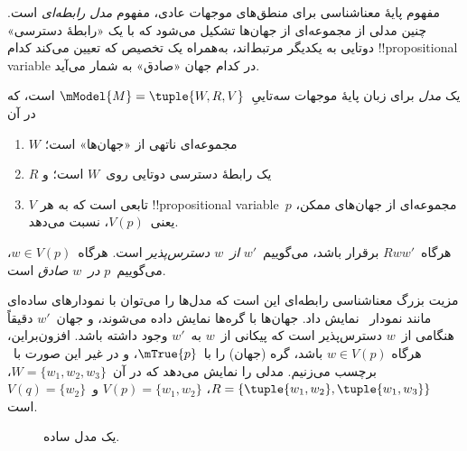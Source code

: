 \documentclass[../../../include/open-logic-section]{subfiles}
\begin{document}


مفهوم پایهٔ معناشناسی برای منطق‌های موجهات عادی، مفهوم
\emph{مدل رابطه‌ای} است. چنین مدلی از مجموعه‌ای از جهان‌ها تشکیل می‌شود
که با یک «رابطهٔ دسترسی» دوتایی به یکدیگر مرتبط‌اند، به‌همراه یک
تخصیص که تعیین می‌کند کدام !!{propositional variable} در کدام جهان
«صادق» به شمار می‌آید.

\begin{defn}
  یک \emph{مدل} برای زبان پایهٔ موجهات سه‌تاییِ~$\mModel{M}
  = \tuple{W, R, V}$ است، که در آن
  \begin{enumerate}
  \item $W$ مجموعه‌ای ناتهی از «جهان‌ها» است؛
  \item $R$ یک رابطهٔ دسترسی دوتایی روی~$W$ است؛ و
  \item $V$ تابعی است که به هر !!{propositional
    variable}~$p$ مجموعه‌ای از جهان‌های ممکن، یعنی~$V(p)$، نسبت می‌دهد.
  \end{enumerate}
  هرگاه~$Rww'$ برقرار باشد، می‌گوییم~$w'$ \emph{از~$w$ دسترس‌پذیر}
  است. هرگاه~$w \in V(p)$، می‌گوییم~$p$ \emph{در~$w$ صادق} است.
\end{defn}

مزیت بزرگ معناشناسی رابطه‌ای این است که مدل‌ها را می‌توان با نمودارهای
ساده‌ای مانند نمودار~ نمایش داد. جهان‌ها با گره‌ها
نمایش داده می‌شوند، و جهان~$w'$ دقیقاً هنگامی از~$w$ دسترس‌پذیر است که
پیکانی از~$w$ به~$w'$ وجود داشته باشد. افزون‌براین، هرگاه
$w \in V(p)$ باشد، گره (جهان) را با~$\mTrue{p}$، و در غیر این صورت
با~ برچسب می‌زنیم.  مدلی را نمایش می‌دهد
که در آن~$W = \{w_1, w_2, w_3\}$،
$R = \{\tuple{w_1, w_2},\tuple{w_1, w_3}\}$،
$V(p) = \{w_1, w_2\}$ و~$V(q) = \{w_2\}$ است.

\begin{figure}
  \begin{center}
  \end{center}
  \caption{یک مدل ساده.}
\end{figure}
\end{document}
